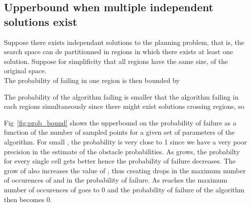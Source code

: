 \documentclass[letterpaper, 10 pt, conference]{ieeeconf}
\theoremstyle{definition}
\begin{document}
\subsection{Upperbound when multiple independent solutions exist}
Suppose there exists  independant solutions to the planning problem, that is, the search space can de partitionned in  regions in which there exists at least one solution. Suppose for simplificity that all regions have the same size,  of the original space.\\
The probability of failing in one region is then bounded by 

The probability of the algorithm failing is smaller that the algorithm failing in each regions simultaneously since there might exist solutions crossing regions, so



Fig~\ref{fig:prob_bound} shows the upperbound on the probability of failure as a function of the number of sampled points  for a given set of parameters of the algorithm. For small , the probability is very close to 1 since we have a very poor precision in the estimate of the obstacle probabilities. As  grows, the probabilty for every single cell gets better hence the probability of failure decreases. The grow of  also increases the value of , thus creating drops in the maximum number of occurences of  and in the probability of failure. As  reaches  the maximum number of occurences of  goes to 0 and the probability of failure of the algorithm then becomes 0.
\end{document}
